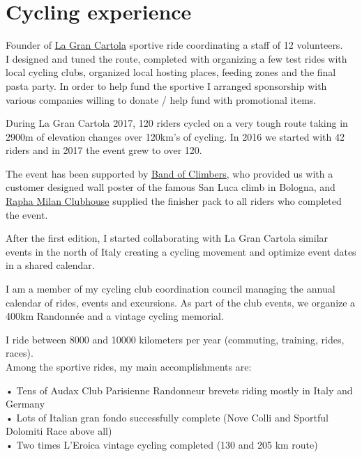 \documentclass[]{friggeri-cv}
\begin{document}
\section{Cycling experience}
Founder of \href{https://lagrancartola.tumblr.com}{\underline{La Gran Cartola}} sportive ride coordinating a staff of 12 volunteers.\\
I designed and tuned the route, completed with organizing a few test rides with local cycling clubs, organized local hosting places,
feeding zones and the final pasta party.  In order to help fund the sportive I arranged sponsorship with various companies willing to donate / help fund with promotional items.\par

During La Gran Cartola 2017, 120 riders cycled on a very tough route taking in 2900m of elevation changes over 120km’s of cycling.
In 2016 we started with 42 riders and in 2017 the event grew to over 120.\par

The event has been supported by \href{www.bandofclimbers.com}{\underline{Band of Climbers}}, who provided us with a customer designed wall poster of the famous San Luca climb in Bologna,
and \href{https://www.rapha.cc/it/it/clubhouses/milan}{\underline{Rapha Milan Clubhouse}} supplied the finisher pack to all riders who completed the event.\par

After the first edition, I started collaborating with La Gran Cartola similar events in the north of Italy creating a cycling movement and optimize event dates in a shared calendar.\par

I am a member of my cycling club coordination council managing the annual calendar of rides, events and excursions.
As part of the club events, we organize a 400km Randonnée and a vintage cycling memorial.\par

I ride between 8000 and 10000 kilometers per year (commuting, training, rides, races).\\
Among the sportive rides, my main accomplishments are:\par

\textbf{} • Tens of Audax Club Parisienne Randonneur brevets riding mostly in Italy and Germany\\
\textbf{} • Lots of Italian gran fondo successfully complete (Nove Colli and Sportful Dolomiti Race above all)\\
\textbf{} • Two times L'Eroica vintage cycling completed (130 and 205 km route)
\end{document}
